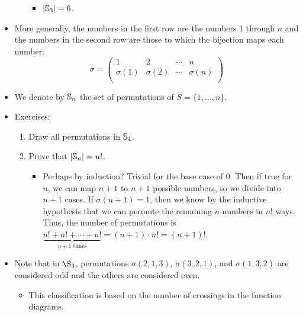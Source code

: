 \documentclass[../apprentice.tex]{subfiles}
\begin{document}
\begin{itemize}
\begin{itemize}
\begin{itemize}
            \item $|\mathbb{S}_3|=6$.
        \end{itemize}
    \end{itemize}
    \item More generally, the numbers in the first row are the numbers 1 through $n$ and the numbers in the second row are those to which the bijection maps each number:
    \begin{equation*}
        \sigma =
        \begin{pmatrix}
            1 & 2 & \cdots & n\\
            \sigma(1) & \sigma(2) & \cdots & \sigma(n)\\
        \end{pmatrix}
    \end{equation*}
    \item We denote by $\mathbb{S}_n$ the set of permutations of $S=\{1,\dots,n\}$.
    \item Exercises:
    \begin{enumerate}
        \item Draw all permutations in $\mathbb{S}_4$.
        \item Prove that $|\mathbb{S}_n|=n!$.
        \begin{itemize}
            \item Perhaps by induction? Trivial for the base case of 0. Then if true for $n$, we can map $n+1$ to $n+1$ possible numbers, so we divide into $n+1$ cases. If $\sigma(n+1)=1$, then we know by the inductive hypothesis that we can permute the remaining $n$ numbers in $n!$ ways. Thus, the number of permutations is $\underbrace{n!+n!+\cdots+n!}_{n+1\text{ times}}=(n+1)\cdot n!=(n+1)!$.
        \end{itemize}
    \end{enumerate}
    \item Note that in $\S_3$, permutations $\sigma(2,1,3)$, $\sigma(3,2,1)$, and $\sigma(1,3,2)$ are considered odd and the others are considered even.
    \begin{itemize}
        \item This classification is based on the number of crossings in the function diagrams.
    \end{itemize}
\end{itemize}
\end{document}
